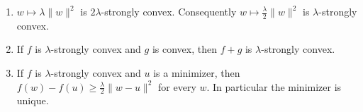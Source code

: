 \begin{proposition}
\label{prop:mlu-sc-three}
\begin{enumerate}[label=(\alph*)]
    \item $w\mapsto\lambda\lVert w\rVert^2$ is $2\lambda$-strongly convex. Consequently $w\mapsto\tfrac{\lambda}{2}\lVert w\rVert^2$ is $\lambda$-strongly convex.
    \item If $f$ is $\lambda$-strongly convex and $g$ is convex, then $f+g$ is $\lambda$-strongly convex.
    \item If $f$ is $\lambda$-strongly convex and $u$ is a minimizer, then $f(w)-f(u)\ge\frac{\lambda}{2}\lVert w-u\rVert^2$ for every $w$. In particular the minimizer is unique.
\end{enumerate}
\end{proposition}

